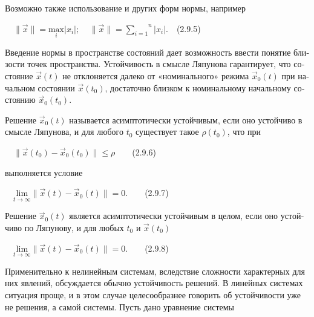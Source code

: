 \documentclass[a4paper]{article}
\begin{document}
{\begin{russian}\sffamily
Возможно также использование и других форм нормы, например
\end{russian}}

{\begin{russian}\sffamily
\ \  $\|\vec x\|=\underset i{\text{max}}|x_i|;\;\;\;\;\|\vec x\|=\overset n{\underset{i=1}{\sum }}|x_i|$.\ \ (2.9.5)
\end{russian}}

{\begin{russian}\sffamily
Введение нормы в пространстве состояний дает возможность ввести понятие близости точек пространства. Устойчивость в
смысле Ляпунова гарантирует, что состояние  $\vec x(t)$ не отклоняется далеко от «номинального» режима  $\vec x_0(t)$
при начальном состоянии  $\vec x(t_0)$, достаточно близком к номинальному начальному состоянию  $\vec x_0(t_0)$.
\end{russian}}

{\begin{russian}\sffamily
Решение  $\vec x_0(t)$ называется асимптотически устойчивым, если оно устойчиво в смысле Ляпунова, и для любого  $t_0$
существует такое  $ρ(t_0)$, что при 
\end{russian}}

{\begin{russian}\sffamily
\ \  $\|\vec x(t_0)-\vec x_0(t_0)\|\le ρ$\ \ \ \ (2.9.6)
\end{russian}}

{\begin{russian}\sffamily
выполняется условие
\end{russian}}

{\begin{russian}\sffamily
\ \  $\underset{t\rightarrow \infty }{\text{lim}}\|\vec x(t)-\vec x_0(t)\|=0$.\ \ \ \ (2.9.7)
\end{russian}}

{\begin{russian}\sffamily
Решение  $\vec x_0(t)$ является асимптотически устойчивым в целом, если оно устойчиво по Ляпунову, и для любых  $t_0$ и 
$\vec x(t_0)$
\end{russian}}

{\begin{russian}\sffamily
\ \  $\underset{t\rightarrow \infty }{\text{lim}}\|\vec x(t)-\vec x_0(t)\|=0$.\ \ \ \ (2.9.8)
\end{russian}}

{\begin{russian}\sffamily
Применительно к нелинейным системам, вследствие сложности харак­терных для них явлений, обсуждается обычно устойчивость
решений. В линейных системах ситуация проще, и в этом случае целесообразнее говорить об устойчивости уже не решения, а
самой системы. Пусть дано уравнение системы
\end{russian}}
\end{document}
